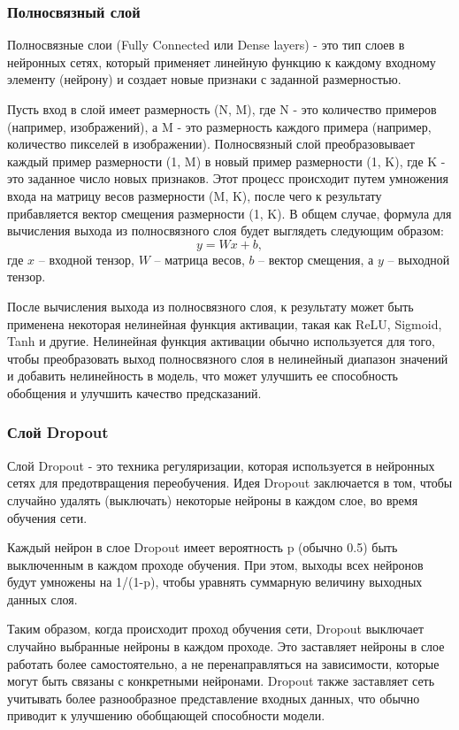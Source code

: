 \documentclass[14pt,a4paper]{extarticle}
\begin{document}
\subsubsection*{Полносвязный слой}
Полносвязные слои (Fully Connected или Dense layers) - это тип слоев в нейронных сетях, который применяет линейную функцию к каждому входному элементу (нейрону) и создает новые признаки с заданной размерностью.

Пусть вход в слой имеет размерность (N, M), где N - это количество примеров (например, изображений), а M - это размерность каждого примера (например, количество пикселей в изображении). Полносвязный слой преобразовывает каждый пример размерности (1, M) в новый пример размерности (1, K), где K - это заданное число новых признаков. Этот процесс происходит путем умножения входа на матрицу весов размерности (M, K), после чего к результату прибавляется вектор смещения размерности (1, K). В общем случае, формула для вычисления выхода из полносвязного слоя будет выглядеть следующим образом:
$$y = Wx + b,$$
где $x$ -- входной тензор, $W$ -- матрица весов, $b$ -- вектор смещения, а $y$ -- вы\-ход\-ной тензор.

После вычисления выхода из полносвязного слоя, к результату может быть применена некоторая нелинейная функция активации, такая как ReLU, Sigmoid, Tanh и другие. Нелинейная функция активации обычно используется для того, чтобы преобразовать выход полносвязного слоя в нелинейный диапазон значений и добавить нелинейность в модель, что может улучшить ее способность обобщения и улучшить качество предсказаний.

\subsubsection*{Слой Dropout}
Слой Dropout - это техника регуляризации, которая используется в нейронных сетях для предотвращения переобучения. Идея Dropout заключается в том, чтобы случайно удалять (выключать) некоторые нейроны в каждом слое, во время обучения сети.

Каждый нейрон в слое Dropout имеет вероятность p (обычно 0.5) быть выключенным в каждом проходе обучения. При этом, выходы всех нейронов будут умножены на 1/(1-p), чтобы уравнять суммарную величину выходных данных слоя.

Таким образом, когда происходит проход обучения сети, Dropout выключает случайно выбранные нейроны в каждом проходе. Это заставляет нейроны в слое работать более самостоятельно, а не перенаправляться на зависимости, которые могут быть связаны с конкретными нейронами. Dropout также заставляет сеть учитывать более разнообразное представление входных данных, что обычно приводит к улучшению обобщающей способности модели.
\end{document}
